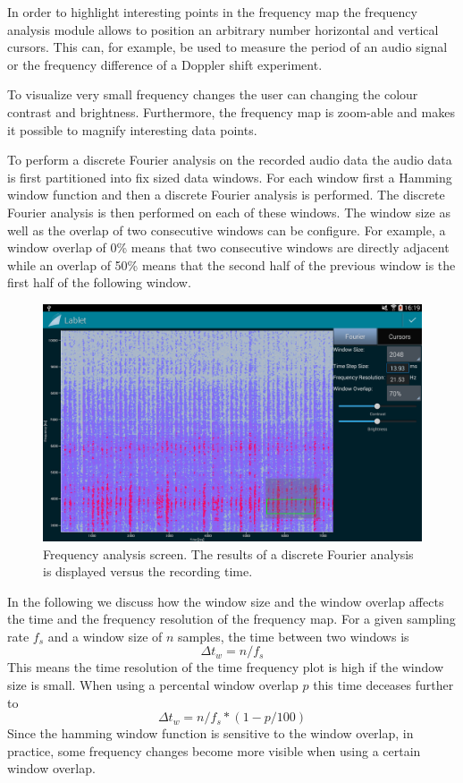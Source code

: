 \documentclass{sigchi}
\begin{document}
In order to highlight interesting points in the frequency map the frequency analysis module allows to position an arbitrary number horizontal and vertical cursors.
This can, for example, be used to measure the period of an audio signal or the frequency difference of
a Doppler shift experiment.

To visualize very small frequency changes the user can changing the colour contrast and brightness.
Furthermore, the frequency map is zoom-able and makes it possible to magnify interesting data points.

To perform a discrete Fourier analysis on the recorded audio data the audio data is first partitioned into fix sized data windows.
For each window first a Hamming window function and then a discrete Fourier analysis is performed.
The discrete Fourier analysis is then performed on each of these windows.
The window size as well as the overlap of two consecutive windows can be configure.
For example, a window overlap of 0\% means that two consecutive windows are directly adjacent while an overlap of 50\% means that the second half of the previous window is the first half of the following window.

\begin{figure}
  \centering
  \includegraphics[width=.99\columnwidth]{FrequencyAnalysis}
  \caption{Frequency analysis screen.
  The results of a discrete Fourier analysis is displayed versus the recording time.\label{fig:FrequencyAnalysis}}
\end{figure}

In the following we discuss how the window size and the window overlap affects the time and the frequency resolution of the frequency map. 
For a given sampling rate $f_s$ and a window size of $n$ samples, the time between two windows is
\[
\Delta t_w = n / f_s
\]
This means the time resolution of the time frequency plot is high if the window size is small.
When using a percental window overlap $p$ this time deceases further to
\[
\Delta t_w = n / f_s * (1 - p / 100)
\]
Since the hamming window function is sensitive to the window overlap, in practice, some frequency changes become more visible when using a certain window overlap.
\end{document}
